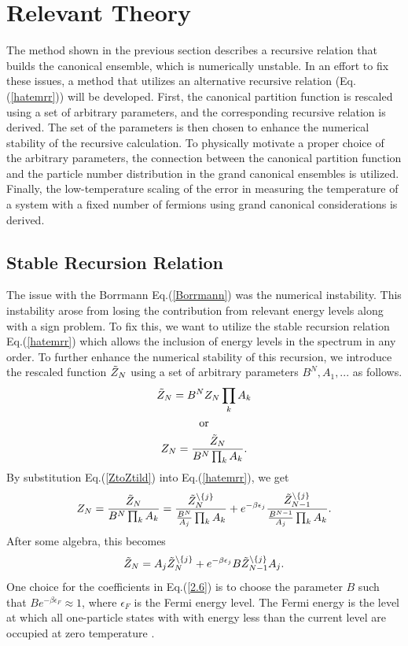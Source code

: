 \chapter{Relevant Theory} \label{ch:ns-equations}
\begin{em}
The method shown in the previous section describes a recursive relation that builds the canonical ensemble, which is numerically unstable. In an effort to fix these issues,  a method that utilizes an alternative recursive relation (Eq.\@(\ref{hatemrr})) will be developed. First, the canonical partition function is rescaled using a set of arbitrary parameters, and the corresponding recursive relation is derived. The set of the parameters is then chosen to enhance the numerical stability of the recursive calculation. To physically motivate a proper choice of the arbitrary parameters, the connection between the canonical partition function and the particle number distribution in the grand canonical ensembles is utilized. Finally, the low-temperature scaling of the error in measuring the temperature of a system with a fixed number of fermions using grand canonical considerations is derived.
\end{em}


\section{Stable Recursion Relation}
The issue with the Borrmann Eq.\@ (\ref{Borrmann}) was the numerical instability. This instability arose from losing the contribution from relevant energy levels along with a sign problem. To fix this, we want to utilize the stable recursion relation Eq.\@ (\ref{hatemrr}) which allows the inclusion of energy levels in the spectrum in any order. To further enhance the numerical stability of this recursion, we introduce the rescaled function $\Tilde{Z}_N$ using a set of arbitrary parameters ${B^N,A_1,...}$ as follows.
\begin{gather}
    \Tilde{Z}_N = B^N Z_N \prod_k A_k \label{ZtildtoZ}\\
    \text{or}\nonumber\\
    Z_N=\frac{\Tilde{Z}_N}{B^N \prod_k A_k}. \label{ZtoZtild}
\end{gather}
By substitution Eq.\@ (\ref{ZtoZtild}) into Eq.\@ (\ref{hatemrr}), we get
\begin{equation}
    Z_N=\frac{\Tilde{Z}_N}{B^N \prod_k A_k} = \frac{\Tilde{Z}_N^{\backslash\{j\}}}{\frac{B^N}{A_j} \prod_k A_k}+e^{-\beta\epsilon_j}\frac{\Tilde{Z}_{N-1}^{\backslash\{j\}}}{\frac{B^{N-1}}{A_j} \prod_k A_k}.
\end{equation}
After some algebra, this becomes
\begin{equation}
   \Tilde{Z}_N=A_j \Tilde{Z}_N^{\backslash\{j\}}+ e^{-\beta\epsilon_j} B \Tilde{Z}_{N-1}^{\backslash\{j\}} A_j.\label{2.6}
\end{equation}
One choice for the coefficients in Eq.\@ (\ref{2.6}) is to choose the parameter $B$ such that $B e^{-\beta\epsilon_F}\approx 1$, where $\epsilon_F$ is the Fermi energy level. The Fermi energy is the level at which all one-particle states with with energy less than the current level are occupied at zero temperature \cite{Kardar}.

